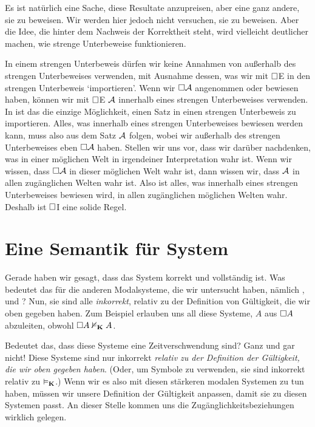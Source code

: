 Es ist natürlich eine Sache, diese Resultate anzupreisen, aber eine ganz andere, sie zu beweisen. Wir werden hier jedoch nicht versuchen, sie zu beweisen. Aber die Idee, die hinter dem Nachweis der Korrektheit steht, wird vielleicht deutlicher machen, wie strenge Unterbeweise funktionieren. 

In einem strengen Unterbeweis dürfen wir keine Annahmen von au{\ss}erhalb des strengen Unterbeweises verwenden, mit Ausnahme dessen, was wir mit $\Box$E in den strengen Unterbeweis `importieren'. Wenn wir $\Box \mathcal{A}$ angenommen oder bewiesen haben, können wir mit $\Box$E $\mathcal{A}$ innerhalb eines strengen Unterbeweises verwenden. In \mlK{} ist das die einzige Möglichkeit, einen Satz in einen strengen Unterbeweis zu importieren. Alles, was innerhalb eines strengen Unterbeweises bewiesen werden kann, muss also aus dem Satz $\mathcal{A}$ folgen, wobei wir au{\ss}erhalb des strengen Unterbeweises eben $\Box \mathcal{A}$ haben. Stellen wir uns vor, dass wir darüber nachdenken, was in einer möglichen Welt in irgendeiner Interpretation wahr ist. Wenn wir wissen, dass $\Box\mathcal{A}$ in dieser möglichen Welt wahr ist, dann wissen wir, dass $\mathcal{A}$ in allen zugänglichen Welten wahr ist. Also ist alles, was innerhalb eines strengen Unterbeweises bewiesen wird, in allen zugänglichen möglichen Welten wahr. Deshalb ist $\Box$I eine solide Regel.

\section{Eine Semantik für System \mlT}
\label{SemanticsT}

Gerade haben wir gesagt, dass das System \mlK{} korrekt und vollständig ist. Was bedeutet das für die anderen Modalsysteme, die wir untersucht haben, nämlich \mlT, \mlSfour{} und \mlSfive? Nun, sie sind alle \emph{inkorrekt}, relativ zu der Definition von Gültigkeit, die wir oben gegeben haben. Zum Beispiel erlauben uns all diese Systeme, $A$ aus $\Box A$ abzuleiten, obwohl $\Box A \nvDash_{\mathbf{K}} A$.

Bedeutet das, dass diese Systeme eine Zeitverschwendung sind? Ganz und gar nicht! Diese Systeme sind nur inkorrekt \emph{relativ zu der Definition der Gültigkeit, die wir oben gegeben haben}. (Oder, um Symbole zu verwenden, sie sind inkorrekt relativ zu $\vDash_{\mathbf{K}}$.) Wenn wir es also mit diesen stärkeren modalen Systemen zu tun haben, müssen wir unsere Definition der Gültigkeit anpassen, damit sie zu diesen Systemen passt. An dieser Stelle kommen uns die Zugänglichkeitsbeziehungen wirklich gelegen.

